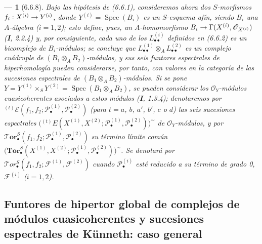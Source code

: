 \documentclass[10pt,oneside,openany]{book}
\theoremstyle{egaenv}\newtheorem*{env}{---}
\theoremstyle{egastatement}
\theoremstyle{egadescription}
\renewcommand{\to}{\mathchoice{\longrightarrow}{\rightarrow}{\rightarrow}{\rightarrow}}
\begin{document}
\begin{env}[6.6.8]
\label{III.6.6.8}
Bajo las hipótesis de (6.6.1), consideremos ahora dos $S$-morfismos
$f_i:X^{(i)}\to Y^{(i)}$, donde
$Y^{(i)}=\operatorname{Spec}(B_i)$ es un $S$-\emph{esquema afín}, siendo
$B_i$ una $A$-álgebra ($i=1,2$); esto define, pues, un $A$-homomorfismo
$B_i\to\Gamma(X^{(i)},\mathscr O_{X^{(i)}})$ (\textbf I, 2.2.4) y, por consiguiente,
cada uno de los $L_{\bullet\bullet}^{(i)}$ definidos en (6.6.2) es un
bicomplejo de $B_i$-módulos; se concluye que
$L_{\bullet\bullet}^{(1)}\otimes_A L_{\bullet\bullet}^{(2)}$ es un
complejo cuádruple de $(B_1\otimes_A B_2)$-módulos, y sus seis funtores
espectrales de hiperhomología pueden considerarse, por tanto, con valores en
la categoría de las sucesiones espectrales de
$(B_1\otimes_A B_2)$-\emph{módulos}. Si se pone
$Y=Y^{(1)}\times_S Y^{(2)}=\operatorname{Spec}(B_1\otimes_A B_2)$, se pueden
considerar los $\mathscr O_Y$-módulos cuasicoherentes asociados a estos
módulos (\textbf I, 1.3.4); denotaremos por
${}^{(t)}\mathscr E
(f_1,f_2;\mathscr P_\bullet^{(1)},\mathscr P_\bullet^{(2)})$
(para $t=a$, $b$, $a'$, $b'$, $c$ o $d$) las seis sucesiones espectrales
$
  \bigl({}^{(t)}E
  (X^{(1)},X^{(2)};
   \mathscr P_\bullet^{(1)},\mathscr P_\bullet^{(2)})\bigr)^{\sim}$
de $\mathscr O_Y$-módulos, y por
$\boldsymbol{\mathscr{T}\!or}_\bullet^S
(f_1,f_2;\mathscr P_\bullet^{(1)},\mathscr P_\bullet^{(2)})$ su término
límite común
$
  \bigl(\mathbf{Tor}_\bullet^S
  (X^{(1)},X^{(2)};
   \mathscr P_\bullet^{(1)},\mathscr P_\bullet^{(2)})\bigr)^{\sim}$. Se denotará por $\mathscr{T}\!or_\bullet^S(f_1,f_2;\mathscr F^{(1)},\mathscr F^{(2)})$
cuando $\mathscr P_\bullet^{(i)}$ esté reducido a su término de grado 0,
$\mathscr F^{(i)}$ ($i=1,2$).
\end{env}

\subsection{Funtores de hipertor global de complejos de módulos
cuasicoherentes y sucesiones espectrales de Künneth: caso general}
\label{subsection:III.6.7}
\end{document}
